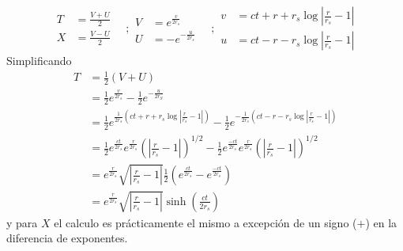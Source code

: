 \begin{equation}
    \begin{aligned}
        T & =\frac{V+U}{2} \\
        X & =\frac{V-U}{2}
    \end{aligned}
    \quad ;
    \begin{aligned}
        V & =e^{\frac{v}{2 r_s}}   \\
        U & =-e^{-\frac{u}{2 r_s}}
    \end{aligned}
    \quad ;
    \begin{aligned}
        v & =c t+r+r_s \log \left|\frac{r}{r_s}-1\right| \\
        u & =c t-r-r_s \log \left|\frac{r}{r_s}-1\right|
    \end{aligned}
\end{equation}
Simplificando
\begin{equation}
    \begin{aligned}
        T & =  \frac{1}{2}\left(V + U\right)                                                                                                                                                                                \\
          & = \frac{1}{2} e^{\frac{v}{2 r_s}}-\frac{1}{2} e^{-\frac{u}{2 r_S}}                                                                                                                                              \\
          & = \frac{1}{2} e^{\frac{1}{2 r_s}\left(c t+r+r_s \log \left|\frac{r}{r_s}-1\right|\right)}-\frac{1}{2} e^{-\frac{1}{2 r_s}\left(c t-r-r_s \log \left|\frac{r}{r_s}-1\right|\right)}                              \\
          & =\frac{1}{2} e^{\frac{c t}{2 r_s}} e^{\frac{r}{2 r_s}}\left(\left|\frac{r}{r_s}-1\right|\right)^{1 / 2}-\frac{1}{2} e^{\frac{-c t}{2 r_s}} e^{\frac{r}{2 r_s}}\left(\left|\frac{r}{r_s}-1\right|\right)^{1 / 2} \\
          & = e^{\frac{r}{2 r_s}} \sqrt{\left|\frac{r}{r_s}-1\right|} \frac{1}{2}\left(e^{\frac{c t}{2 r_s}}-e^{\frac{-c t}{2 r_s}}\right)                                                                                  \\
          & = e^{\frac{r}{2 r_s}} \sqrt{\left|\frac{r}{r_s}-1\right|} \sinh\left(\frac{ct}{2r_s}\right)
        \label{eq:Kruskal-SzekeresT(r,t)}
    \end{aligned}
\end{equation}
y para $X$ el calculo es prácticamente el mismo a excepción de un signo ($+$) en la diferencia de exponentes.
